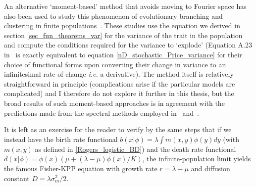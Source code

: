 An alternative `moment-based' method that avoids moving to Fourier space has also been used to study this phenomenon of evolutionary branching and clustering in finite populations~\citep{wakano_evolutionary_2013,debarre_evolutionary_2016}. These studies use the equation we derived in section \ref{sec_fun_theorems_var} for the variance of the trait in the population and compute the conditions required for the variance to `explode' (Equation A.23 in~\cite{debarre_evolutionary_2016} is exactly equivalent to equation \eqref{nD_stochastic_Price_variance} for their choice of functional forms upon converting their change in variance to an infinitesimal rate of change \emph{i.e.} a derivative). The method itself is relatively straightforward in principle (complications arise if the particular models are complicated) and I therefore do not explore it further in this thesis, but the broad results of such moment-based approaches is in agreement with the predictions made from the spectral methods employed in~\cite{rogers_demographic_2012} and~\cite{rogers_modes_2015}.

It is left as an exercise for the reader to verify by the same steps that if we instead have the birth rate functional $b(x|\phi) = \lambda\int m(x,y)\phi(y)dy$ (with $m(x,y)$ as defined in \eqref{Rogers_logistic_BD}) and the death rate functional $d(x|\phi) = \phi(x)\left(\mu+(\lambda-\mu)\phi(x)/K\right)$, the infinite-population limit yields the famous Fisher-KPP equation with growth rate $r=\lambda-\mu$ and diffusion constant $D = \lambda \sigma_m^2/2$.
